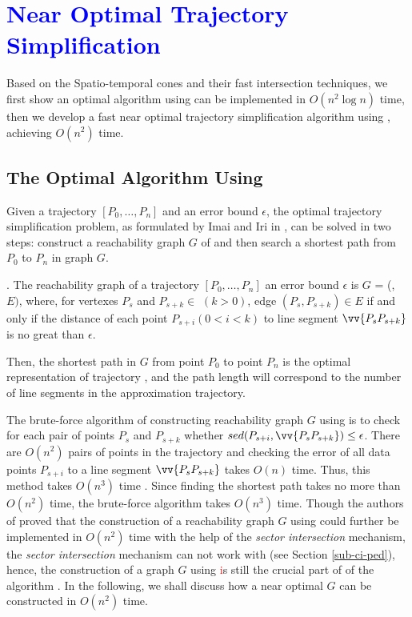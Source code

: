 \section{\textcolor{blue}{Near Optimal Trajectory Simplification}}
\label{sec-optimal}

Based on the Spatio-temporal cones and their fast intersection techniques, we first show an optimal algorithm using \sed can be implemented in $O(n^2\log n)$ time, then we develop a fast near optimal trajectory simplification algorithm using \sed, achieving $O(n^2)$ time.

\subsection{The Optimal Algorithm Using \sed}

Given a trajectory ${[P_0, \ldots, P_n]}$ and an error bound $\epsilon$, the optimal trajectory simplification problem, as formulated by Imai and Iri in \cite{Imai:Optimal}, can be solved in two steps: construct a reachability graph $G$ of  and then search a shortest path from $P_0$ to $P_{n}$ in graph $G$.

. The reachability graph of a trajectory ${[P_0, \ldots, P_n]}$ \wrt an error bound $\epsilon$ is $G$
= (, $E)$, where, for vertexes $P_s$ and $P_{s+k} \in$  $(k>0)$, edge $(P_s, P_{s+k}) \in E$ if and only if the distance of each point $P_{s+i} (0<i<k)$ to line segment $\vv{P_sP_{s+k}}$ is no great than $\epsilon$.

Then, the shortest path in $G$ from point $P_0$ to point $P_{n}$ is the optimal representation of trajectory , and the path length will correspond to the number of line segments in the approximation trajectory. 


The brute-force algorithm of constructing reachability graph $G$ using \sed is to check for each pair of points $P_s$ and $P_{s+k}$ whether $sed(P_{s+i}, \vv{P_sP_{s+k}}) \le \epsilon$. 
There are $O(n^2)$ pairs of points in the trajectory and checking the error of all data points $P_{s+i}$ to a line segment $\vv{P_sP_{s+k}}$ takes $O(n)$ time. 
Thus, this method takes $O(n^3)$ time \cite{Imai:Optimal}. 
Since finding the shortest path takes no more than $O(n^2)$ time, the brute-force algorithm takes $O(n^3)$ time.
%
Though the authors of \cite{Chan:Optimal} proved that the construction of a reachability graph $G$ using \ped could further be implemented in $O(n^2)$ time with the help of the \textit{sector intersection} mechanism, the \textit{sector intersection} mechanism can not work with \sed (see Section \ref{sub-ci-ped}), hence, the construction of a graph  $G$ using \sed \textcolor{red} is still the crucial part of of the algorithm
. 
In the following, we shall discuss how a near optimal $G$ can be constructed in $O(n^2)$ time.


